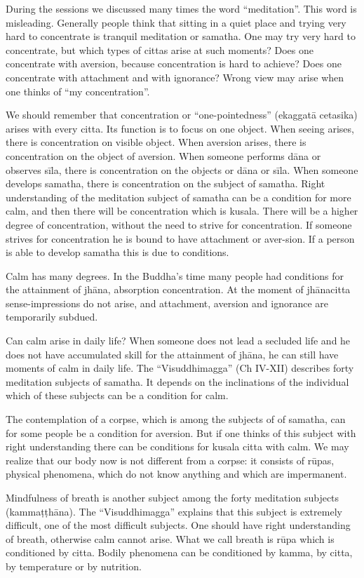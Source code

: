 During the sessions we discussed many times the word ``meditation''.
This word is misleading. Generally people think that sitting in a quiet
place and trying very hard to concentrate is tranquil meditation or
samatha. One may try very hard to concentrate, but which types of cittas
arise at such moments? Does one concentrate with aversion, because
concentration is hard to achieve? Does one concentrate with attachment
and with ignorance? Wrong view may arise when one thinks of ``my
concentration''.

We should remember that concentration or ``one-pointedness'' (ekaggatā
cetasika) arises with every citta. Its function is to focus on one
object. When seeing arises, there is concentration on visible object.
When aversion arises, there is concentration on the object of aversion.
When someone performs dāna or observes sīla, there is concentration on
the objects or dāna or sīla. When someone develops samatha, there is
concentration on the subject of samatha. Right understanding of the
meditation subject of samatha can be a condition for more calm, and then
there will be concentration which is kusala. There will be a higher
degree of concentration, without the need to strive for concentration.
If someone strives for concentration he is bound to have attachment or
aver-sion. If a person is able to develop samatha this is due to
conditions.

Calm has many degrees. In the Buddha's time many people had conditions
for the attainment of jhāna, absorption concentration. At the moment of
jhānacitta sense-impressions do not arise, and attachment, aversion and
ignorance are temporarily subdued.

Can calm arise in daily life? When someone does not lead a secluded life
and he does not have accumulated skill for the attainment of jhāna, he
can still have moments of calm in daily life. The ``Visuddhimagga'' (Ch
IV-XII) describes forty meditation subjects of samatha. It depends on
the inclinations of the individual which of these subjects can be a
condition for calm.

The contemplation of a corpse, which is among the subjects of of
samatha, can for some people be a condition for aversion. But if one
thinks of this subject with right understanding there can be conditions
for kusala citta with calm. We may realize that our body now is not
different from a corpse: it consists of rūpas, physical phenomena, which
do not know anything and which are impermanent.

Mindfulness of breath is another subject among the forty meditation
subjects (kammaṭṭhāna). The ``Visuddhimagga'' explains that this subject
is extremely difficult, one of the most difficult subjects. One should
have right understanding of breath, otherwise calm cannot arise. What we
call breath is rūpa which is conditioned by citta. Bodily phenomena can
be conditioned by kamma, by citta, by temperature or by nutrition.

